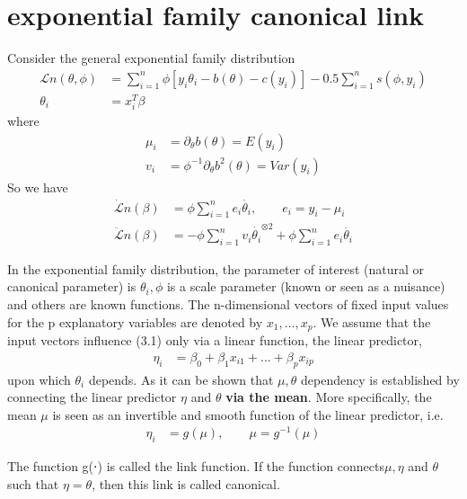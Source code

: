 

\section{exponential family canonical link}
 Consider the general exponential family distribution
\begin{align}
    \mathcal{L}n (\theta, \phi) &= \sum_{i=1}^n \phi  \left[ y_{i}\theta_i - b(\theta) - c(y_i)\right] - 0.5 \sum_{i=1}^n s(\phi,y_i)\\
    \theta_i &= x_i^T \beta
\end{align}
 where   
\begin{align*}
    \mu_i&= \partial_{\theta}b(\theta) = E(y_i)\\
    v_i &= \phi^{-1} \partial_{\theta} b^2(\theta) = Var(y_i)
\end{align*}
So we have
\begin{align*}
    \dot{\mathcal{L}}n (\beta) &= \phi \sum_{i=1}^n  e_{i} \dot{\theta_i}, \qquad e_i= y_i-\mu_i\\
    \ddot{\mathcal{L}}n (\beta) &= -\phi \sum_{i=1}^n  v_{i} \dot{\theta_i}^{\otimes 2} + \phi \sum_{i=1}^n  e_{i} \ddot{\theta_i}
\end{align*}

In the exponential family distribution, the parameter of interest (natural or canonical parameter) is $\theta_i, \phi$  is a scale parameter (known or seen as a nuisance) and others are known functions. The n-dimensional vectors of fixed input values for the p explanatory variables are denoted by $x_1,…,x_p$. We assume that the input vectors influence (3.1) only via a linear function, the linear predictor,
\begin{align}
    \eta_i &= \beta_0 + \beta_1x_{i1} + ... + \beta_px_{ip}
\end{align}
upon which $\theta_i$ depends. As it can be shown that $\mu, \theta$ dependency is established by connecting the linear predictor $\eta$ and $\theta$ \textbf{ via the mean}. More specifically, the mean $\mu$ is seen as an invertible and smooth function of the linear predictor, i.e.
\begin{align}
    \eta_i &= g(\mu), \qquad \mu= g^{-1}(\mu)
\end{align}

The function g(⋅) is called the link function. If the function connects$\mu ,\eta$ and $\theta$ such that $\eta = \theta$, then this link is called canonical.\\

